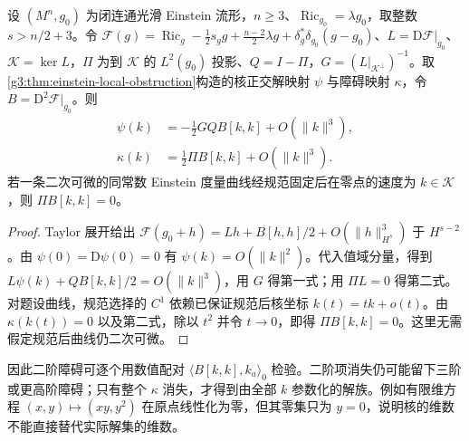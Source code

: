 \begin{proposition}\label{g3:prop:einstein-second-order-obstruction}
	设 \((M^n,g_0)\) 为闭连通光滑 Einstein 流形，\(n\ge3\)、\(\operatorname{Ric}_{g_0}=\lambda g_0\)，取整数 \(s>n/2+3\)。令 \(\mathcal F(g)=\operatorname{Ric}_g-\tfrac12s_gg+\tfrac{n-2}2\lambda g+\delta_g^*\delta_{g_0}(g-g_0)\)、\(L=\mathrm D\mathcal F|_{g_0}\)、\(\mathcal K=\ker L\)，\(\Pi\) 为到 \(\mathcal K\) 的 \(L^2(g_0)\) 投影、\(Q=I-\Pi\)，\(G=(L|_{\mathcal K^\perp})^{-1}\)。取\cref{g3:thm:einstein-local-obstruction}构造的核正交解映射 \(\psi\) 与障碍映射 \(\kappa\)，令 \(B=\mathrm D^2\mathcal F|_{g_0}\)。则
	\begin{equation}\label{g3:eq:einstein-quadratic-obstruction}
		\begin{aligned}
		\psi(k)&=-\tfrac12GQ B[k,k]+O(\|k\|^3),\\
		\kappa(k)&=\tfrac12\Pi B[k,k]+O(\|k\|^3).
		\end{aligned}
	\end{equation}
	若一条二次可微的同常数 Einstein 度量曲线经规范固定后在零点的速度为 \(k\in\mathcal K\)，则 \(\Pi B[k,k]=0\)。
\end{proposition}
\begin{proof}
	Taylor 展开给出 \(\mathcal F(g_0+h)=Lh+B[h,h]/2+O(\|h\|_{H^s}^3)\) 于 \(H^{s-2}\)。由 \(\psi(0)=\mathrm D\psi(0)=0\) 有 \(\psi(k)=O(\|k\|^2)\)。代入值域分量，得到
	\(L\psi(k)+QB[k,k]/2=O(\|k\|^3)\)，用 \(G\) 得第一式；用 \(\Pi L=0\) 得第二式。对题设曲线，规范选择的 \(C^1\) 依赖已保证规范后核坐标 \(k(t)=tk+o(t)\)。由 \(\kappa(k(t))=0\) 以及第二式，除以 \(t^2\) 并令 \(t\to0\)，即得 \(\Pi B[k,k]=0\)。这里无需假定规范后曲线仍二次可微。
\end{proof}

因此二阶障碍可逐个用数值配对 \(\langle B[k,k],k_a\rangle_0\) 检验。二阶项消失仍可能留下三阶或更高阶障碍；只有整个 \(\kappa\) 消失，才得到由全部 \(k\) 参数化的解族。例如有限维方程 \((x,y)\mapsto(xy,y^2)\) 在原点线性化为零，但其零集只为 \(y=0\)，说明核的维数不能直接替代实际解集的维数。

\ProseParagraphBreak

